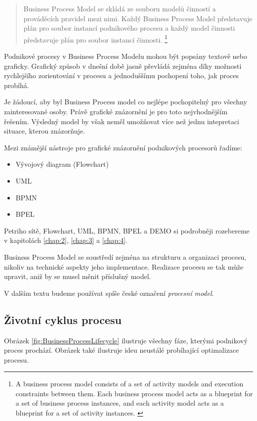 \begin{quote}
Business Process Model se skládá ze souboru modelů činností a prováděcích pravidel mezi nimi. Každý Business Process Model představuje plán pro soubor instancí podnikového procesu a každý model činnosti představuje plán pro soubor instancí činnosti.
\footnote{A business process model consists of a set of activity models and execution constraints between them. Each business process model acts as a blueprint for a set of business process instances, and each activity model acts as a blueprint for a set of activity instances. \cite{Weske2007}}
\end{quote}

Podnikové procesy v Business Process Modelu mohou být popsány textově nebo graficky. Grafický způsob v dnešní době jasně převládá zejména díky možnosti rychlejšího zorientování v procesu a jednoduššímu pochopení toho, jak proces probíhá.

Je žádoucí, aby byl Business Process model co nejlépe pochopitelný pro všechny zainteresované osoby. Právě grafické znázornění je pro toto nejvhodnějším řešením. Výsledný model by však neměl umožňovat více než jednu intepretaci situace, kterou znázorňuje.

Mezi známější nástroje pro grafické znázornění podnikových procesorů řadíme: \cite{Naplava2015}
\begin{itemize}
\item Vývojový diagram (Flowchart)
\item UML
\item BPMN
\item BPEL
\end{itemize}

Petriho sítě, Flowchart, UML, BPMN, BPEL a DEMO si podrobněji rozebereme v kapitolách \ref{chap:2}, \ref{chap:3} a \ref{chap:4}.

Business Process Model se soustředí zejména na strukturu a organizaci procesu, nikoliv na technické aspekty jeho implementace. Realizace procesu se tak může upravit, aniž by se musel měnit příslušný model.

V dalším textu budeme používat spíše české označení \textit{procesní model}.

\subsection{Životní cyklus procesu}
Obrázek \ref{fig:BusinessProcessLifecycle} ilustruje všechny fáze, kterými podnikový proces prochází. Obrázek také ilustruje ideu neustálé probíhající optimalizace procesu.

